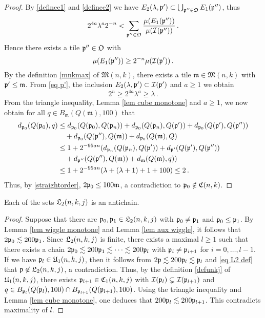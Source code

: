 \begin{proof}
    By \eqref{definee1} and \eqref{definee2} we have $E_2(\lambda, \mathfrak p') \subset \bigcup_{\mathfrak p'' \in \mathfrak{O}} E_1(\mathfrak p'')$, thus
    $$
        2^{4a}\lambda^a 2^{-n} < \sum_{\mathfrak p'' \in \mathfrak{O}} \frac{\mu(E_1(\mathfrak p''))}{\mu(\mathcal{I}(\mathfrak p''))}\,.
    $$
    Hence there exists a tile $\mathfrak p'' \in \mathfrak{O}$ with
    \begin{equation*}
        \mu(E_1(\mathfrak p'')) \ge 2^{-n} \mu(\mathcal{I}(\mathfrak p'))\,.
    \end{equation*}
    By the definition \eqref{mnkmax} of $\mathfrak{M}(n,k)$, there exists a tile $\mathfrak{m} \in \mathfrak{M}(n,k)$ with $\mathfrak p' \leq \mathfrak{m}$. From \eqref{eq p'}, the inclusion $E_2(\lambda, \mathfrak p') \subset \mathcal{I}(\mathfrak p')$ and $a\ge 1$ we obtain
    $$
        2^n \geq 2^{4a} \lambda^{a} \geq \lambda\,.
    $$
    From the triangle inequality, Lemma \ref{lem cube monotone} and $a \ge 1$, we now obtain for all $q \in B_{\mathfrak{m}}(Q(\mathfrak{m}), 100)$ that
    \begin{align*}
        d_{\mathfrak p_0}(Q(\mathfrak p_0), q)
        &\leq d_{\mathfrak p_0}(Q(\mathfrak p_0), Q(\mathfrak p_{n}))  + d_{\mathfrak p_0}(Q(\mathfrak p_{n}), Q(\mathfrak p'))  + d_{\mathfrak p_0}(Q(\mathfrak p'), Q(\mathfrak p''))\\
        &\quad+ d_{\mathfrak p_0}(Q(\mathfrak p''), Q(\mathfrak{m})) +
        d_{\mathfrak p_0}(Q(\mathfrak{m}), Q)\\
        &\leq 1 + 2^{-95an} (d_{\mathfrak p_{n}}(Q(\mathfrak p_n), Q(\mathfrak p'))  + d_{\mathfrak p'}(Q(\mathfrak p'), Q(\mathfrak p''))\\
        &\quad+ d_{\mathfrak p''}(Q(\mathfrak p''), Q(\mathfrak{m})) +
        d_{\mathfrak{m}}(Q(\mathfrak{m}), q))\\
        &\leq 1 + 2^{-95an}(\lambda + (\lambda + 1) + 1 + 100) \leq 2\,.
    \end{align*}
    Thus, by \eqref{straightorder}, $2\mathfrak p_0 \leq 100\mathfrak{m}$, a contradiction to $\mathfrak p_0 \notin \mathfrak C(n,k)$.
\end{proof}

\begin{lemma}
    Each of the sets $\mathfrak L_2(n,k,j)$ is an antichain.
\end{lemma}

\begin{proof}
    Suppose that there are $\mathfrak p_0, \mathfrak p_1 \in \mathfrak L_2(n,k,j)$ with $\mathfrak p_0 \ne \mathfrak p_1$ and $\mathfrak p_0 \le \mathfrak p_1$. By Lemma \ref{lem wiggle monotone} and Lemma \ref{lem aux wiggle}, it follows that $2\mathfrak p_0 \lesssim 200\mathfrak p_1$. Since $\mathfrak L_2(n,k,j)$ is finite, there exists a maximal $l \ge 1$ such that there exists a chain $2\mathfrak p_0 \lesssim 200 \mathfrak p_1 \lesssim \dotsb \lesssim 200 \mathfrak p_l$ with $\mathfrak p_i \ne \mathfrak p_{i+1}$ for $i = 0, \dotsc, l-1$.
    If we have $\mathfrak p_l \in \mathfrak U_1(n,k,j)$, then it follows from $2\mathfrak p \lesssim 200 \mathfrak p_l \lesssim \mathfrak p_l$ and \eqref{eq L2 def} that $\mathfrak p \not\in \mathfrak L_2(n,k,j)$, a contradiction. Thus, by the definition \eqref{defunkj}  of $\mathfrak U_1(n,k,j)$, there exists $\mathfrak p_{l+1} \in \mathfrak C_1(n,k,j)$ with $\mathcal{I}(\mathfrak p_l) \subsetneq \mathcal{I}(\mathfrak p_{l+1}) $ and $q \in B_{\mathfrak p_l}(Q(\mathfrak p_l), 100) \cap B_{\mathfrak p_{l+1}}(Q(\mathfrak p_{l+1}), 100)$. Using the triangle inequality and Lemma \ref{lem cube monotone}, one deduces that $200 \mathfrak p_l \lesssim 200\mathfrak p_{l+1}$. This contradicts maximality of $l$.
\end{proof}

